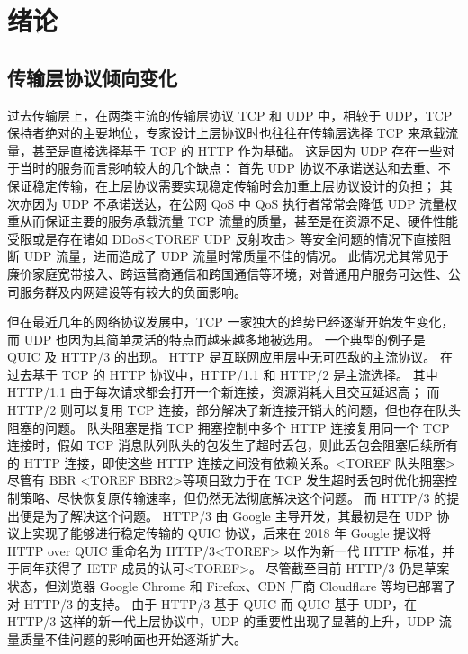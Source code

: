 

\chapter{绪论}

\section{传输层协议倾向变化}

过去传输层上，在两类主流的传输层协议 TCP 和 UDP 中，相较于 UDP，TCP 保持者绝对的主要地位，专家设计上层协议时也往往在传输层选择 TCP 来承载流量，甚至是直接选择基于 TCP 的 HTTP 作为基础。
这是因为 UDP 存在一些对于当时的服务而言影响较大的几个缺点：
首先 UDP 协议不承诺送达和去重\cite{rfc768}、不保证稳定传输，在上层协议需要实现稳定传输时会加重上层协议设计的负担；
其次亦因为 UDP 不承诺送达，在公网 QoS 中 QoS 执行者常常会降低 UDP 流量权重从而保证主要的服务承载流量 TCP 流量的质量，甚至是在资源不足、硬件性能受限或是存在诸如 DDoS<TOREF UDP 反射攻击> 等安全问题的情况下直接阻断 UDP 流量，进而造成了 UDP 流量时常质量不佳的情况。
此情况尤其常见于廉价家庭宽带接入、跨运营商通信和跨国通信等环境，对普通用户服务可达性、公司服务群及内网建设等有较大的负面影响。

但在最近几年的网络协议发展中，TCP 一家独大的趋势已经逐渐开始发生变化，而 UDP 也因为其简单灵活的特点而越来越多地被选用。
一个典型的例子是 QUIC 及 HTTP/3 的出现。
HTTP 是互联网应用层中无可匹敌的主流协议。
在过去基于 TCP 的 HTTP 协议中，HTTP/1.1 和 HTTP/2 是主流选择。
其中 HTTP/1.1 由于每次请求都会打开一个新连接，资源消耗大且交互延迟高；
而 HTTP/2 则可以复用 TCP 连接，部分解决了新连接开销大的问题，但也存在队头阻塞的问题。
队头阻塞是指 TCP 拥塞控制中多个 HTTP 连接复用同一个 TCP 连接时，假如 TCP 消息队列队头的包发生了超时丢包，则此丢包会阻塞后续所有的 HTTP 连接，即使这些 HTTP 连接之间没有依赖关系。<TOREF 队头阻塞>
尽管有 BBR\cite{45646} <TOREF BBR2>等项目致力于在 TCP 发生超时丢包时优化拥塞控制策略、尽快恢复原传输速率，但仍然无法彻底解决这个问题。
而 HTTP/3 的提出便是为了解决这个问题。
HTTP/3 由 Google 主导开发，其最初是在 UDP 协议上实现了能够进行稳定传输的 QUIC 协议，后来在 2018 年 Google 提议将 HTTP over QUIC 重命名为 HTTP/3<TOREF> 以作为新一代 HTTP 标准，并于同年获得了 IETF 成员的认可<TOREF>。
尽管截至目前 HTTP/3 仍是草案状态\cite{ietf-quic-http-34}，但浏览器 Google Chrome 和 Firefox、CDN 厂商 Cloudflare 等均已部署了对 HTTP/3 的支持。
由于 HTTP/3 基于 QUIC 而 QUIC 基于 UDP，在 HTTP/3 这样的新一代上层协议中，UDP 的重要性出现了显著的上升，UDP 流量质量不佳问题的影响面也开始逐渐扩大。

